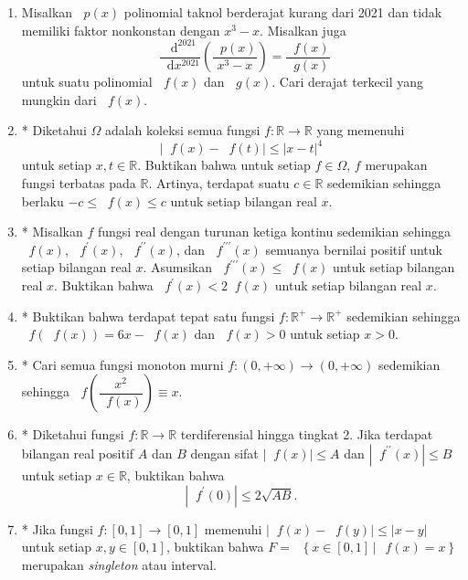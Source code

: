 \documentclass[12pt]{article}
\newcommand*\diff{\mathop{}\!\mathrm{d}}
\newcommand*\func[2]{\mathop{}\!{#1}{\left({#2}\right)}}
\newcommand*\set[2]{\mathop{}\!\left\lbrace{{#1} \, \left| \, {#2} \right.}\right\rbrace}
\begin{document}
\begin{enumerate}[leftmargin=*]
		\item Misalkan $ \func{p}{x} $ polinomial taknol berderajat kurang dari 2021 dan tidak memiliki faktor nonkonstan dengan $ x^{3} - x $. Misalkan juga
		\[ \func{\frac{\diff^{2021}}{\diff x^{2021}}}{\frac{\func{p}{x}}{x^{3} - x}} = \frac{\func{f}{x}}{\func{g}{x}} \]
		untuk suatu polinomial $ \func{f}{x} $ dan $ \func{g}{x} $. Cari derajat terkecil yang mungkin dari $ \func{f}{x} $.
		\item* Diketahui $ \Omega $ adalah koleksi semua fungsi $ f : \mathbb{R} \to \mathbb{R} $ yang memenuhi
		\[ \left|\func{f}{x} - \func{f}{t}\right| \leq \left|x - t\right|^{4} \]
		untuk setiap $ x, t \in \mathbb{R} $. Buktikan bahwa untuk setiap $ f \in \Omega $, $ f $ merupakan fungsi terbatas pada $ \mathbb{R} $. Artinya, terdapat suatu $ c \in \mathbb{R} $ sedemikian sehingga berlaku $ -c \leq \func{f}{x} \leq c $ untuk setiap bilangan real $ x $.
		\item* Misalkan $ f $ fungsi real dengan turunan ketiga kontinu sedemikian sehingga $ \func{f}{x} $, $ \func{f^{\prime}}{x} $, $ \func{f^{\prime\prime}}{x} $, dan $ \func{f^{\prime\prime\prime}}{x} $ semuanya bernilai positif untuk setiap bilangan real $ x $. Asumsikan $ \func{f^{\prime\prime\prime}}{x} \leq \func{f}{x} $ untuk setiap bilangan real $ x $. Buktikan bahwa $ \func{f^{\prime}}{x} < 2\func{f}{x} $ untuk setiap bilangan real $ x $.
		\item* Buktikan bahwa terdapat tepat satu fungsi $ f : \mathbb{R^{+}} \to \mathbb{R}^{+} $ sedemikian sehingga $ \func{f}{\func{f}{x}} = 6x - \func{f}{x} $ dan $ \func{f}{x} > 0 $ untuk setiap $ x > 0 $.
		\item* Cari semua fungsi monoton murni $ f : \left(0, +\infty\right) \to \left(0, +\infty\right) $ sedemikian sehingga $ \func{f}{\dfrac{x^{2}}{\func{f}{x}}} \equiv x $.
		\item* Diketahui fungsi $ f : \mathbb{R} \to \mathbb{R} $ terdiferensial hingga tingkat 2. Jika terdapat bilangan real positif $ A $ dan $ B $ dengan sifat $ \left|\func{f}{x}\right| \leq A $ dan $ \left|\func{f^{\prime\prime}}{x}\right| \leq B $ untuk setiap $ x \in \mathbb{R} $, buktikan bahwa
		\[ \left|\func{f^{\prime}}{0}\right| \leq 2\sqrt{AB}. \]
		\item* Jika fungsi $ f : \left[0, 1\right] \to \left[0, 1\right] $ memenuhi $ \left|\func{f}{x} - \func{f}{y}\right| \leq \left|x - y\right| $ untuk setiap $ x, y \in \left[0, 1\right] $, buktikan bahwa $ F = \set{x \in \left[0, 1\right]}{\func{f}{x} = x} $ merupakan \textit{singleton} atau interval. \\

\end{enumerate}
\end{document}
